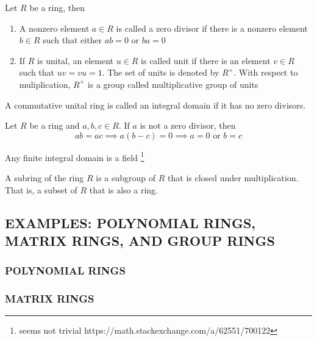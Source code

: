 \begin{definition}
	Let $R$ be a ring, then
	\begin{enumerate}
		\item A nonzero element $a \in R$ is called a zero divisor if there is a nonzero element $b \in R$ such that either $ab = 0$ or $ba = 0$
		\item If $R$ is unital, an element $u \in R$ is called unit if there is an element $v \in R$ such that $uv = vu = 1$. The set of units is denoted by $R^\times$. With respect to muliplication, $R^\times$ is a group called multiplicative group of units
	\end{enumerate}
\end{definition}

\begin{definition}
	A commutative unital ring is called an integral domain if it has no zero divisors.
\end{definition}

\begin{proposition}
	Let $R$ be a ring and $a, b, c \in R$. If $a$ is not a zero divisor, then
	$$
		ab = ac \implies a (b - c) = 0 \implies a = 0 \text{ or } b = c
	$$
\end{proposition}

\begin{corollary}
	Any finite integral domain is a field \footnote{seems not trivial https://math.stackexchange.com/a/62551/700122}
\end{corollary}

\begin{definition}[subring]
	A subring of the ring $R$ is a subgroup of $R$ that is closed under multiplication. That is, a subset of $R$ that is also a ring.
\end{definition}

\subsection{EXAMPLES: POLYNOMIAL RINGS, MATRIX RINGS, AND GROUP RINGS}

\subsubsection{POLYNOMIAL RINGS}


\subsubsection{MATRIX RINGS}

